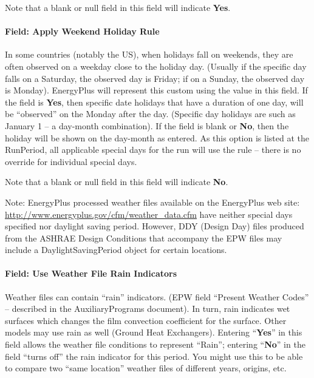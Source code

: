 Note that a blank or null field in this field will indicate \textbf{Yes}.

\paragraph{Field: Apply Weekend Holiday Rule}\label{field-apply-weekend-holiday-rule-1}

In some countries (notably the US), when holidays fall on weekends, they are often observed on a weekday close to the holiday day. (Usually if the specific day falls on a Saturday, the observed day is Friday; if on a Sunday, the observed day is Monday). EnergyPlus will represent this custom using the value in this field. If the field is \textbf{Yes}, then specific date holidays that have a duration of one day, will be ``observed'' on the Monday after the day. (Specific day holidays are such as January 1 -- a day-month combination). If the field is blank or \textbf{No}, then the holiday will be shown on the day-month as entered. As this option is listed at the RunPeriod, all applicable special days for the run will use the rule -- there is no override for individual special days.

Note that a blank or null field in this field will indicate \textbf{No}.

\begin{callout}
Note: EnergyPlus processed weather files available on the EnergyPlus web site: \url{http://www.energyplus.gov/cfm/weather\_data.cfm} have neither special days specified nor daylight saving period. However, DDY (Design Day) files produced from the ASHRAE Design Conditions that accompany the EPW files may include a DaylightSavingPeriod object for certain locations.
\end{callout}

\paragraph{Field: Use Weather File Rain Indicators}\label{field-use-weather-file-rain-indicators-1}

Weather files can contain ``rain'' indicators. (EPW field ``Present Weather Codes'' -- described in the AuxiliaryPrograms document). In turn, rain indicates wet surfaces which changes the film convection coefficient for the surface. Other models may use rain as well (Ground Heat Exchangers). Entering ``\textbf{Yes}'' in this field allows the weather file conditions to represent ``Rain''; entering ``\textbf{No}'' in the field ``turns off'' the rain indicator for this period. You might use this to be able to compare two ``same location'' weather files of different years, origins, etc.

